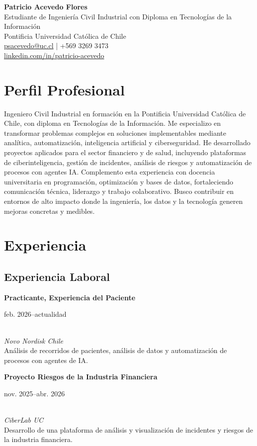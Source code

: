 \documentclass[letterpaper,10pt]{article}
\newcommand{\cventry}[4]{%
  \noindent\parbox[t]{0.74\textwidth}{\textbf{#1}}%
  \hfill
  \parbox[t]{0.24\textwidth}{\raggedleft #2}\\
  \textit{#3}\\
  #4\par\vspace{0.45em}
}
\begin{document}
\begin{center}
    {\LARGE \textbf{Patricio Acevedo Flores}} \\
    \vspace{0.3em}
    Estudiante de Ingeniería Civil Industrial con Diploma en Tecnologías de la Información \\
    Pontificia Universidad Católica de Chile \\
    \href{mailto:psacevedo@uc.cl}{psacevedo@uc.cl} \quad | \quad +569 3269 3473 \\
    \href{https://linkedin.com/in/patricio-andrés-acevedo-flores-63300b30b/}{linkedin.com/in/patricio-acevedo}
\end{center}

\section*{Perfil Profesional}
Ingeniero Civil Industrial en formación en la Pontificia Universidad Católica de Chile, con diploma en Tecnologías de la Información. Me especializo en transformar problemas complejos en soluciones implementables mediante analítica, automatización, inteligencia artificial y ciberseguridad. He desarrollado proyectos aplicados para el sector financiero y de salud, incluyendo plataformas de ciberinteligencia, gestión de incidentes, análisis de riesgos y automatización de procesos con agentes IA. Complemento esta experiencia con docencia universitaria en programación, optimización y bases de datos, fortaleciendo comunicación técnica, liderazgo y trabajo colaborativo. Busco contribuir en entornos de alto impacto donde la ingeniería, los datos y la tecnología generen mejoras concretas y medibles.


\section*{Experiencia}

\subsection*{Experiencia Laboral}

\cventry
  {Practicante, Experiencia del Paciente}
  {feb. 2026--actualidad}
  {Novo Nordisk Chile}
  {Análisis de recorridos de pacientes, análisis de datos y automatización de procesos con agentes de IA.}

\cventry
  {Proyecto Riesgos de la Industria Financiera}
  {nov. 2025--abr. 2026}
  {CiberLab UC}
  {Desarrollo de una plataforma de análisis y visualización de incidentes y riesgos de la industria financiera.}
\end{document}
